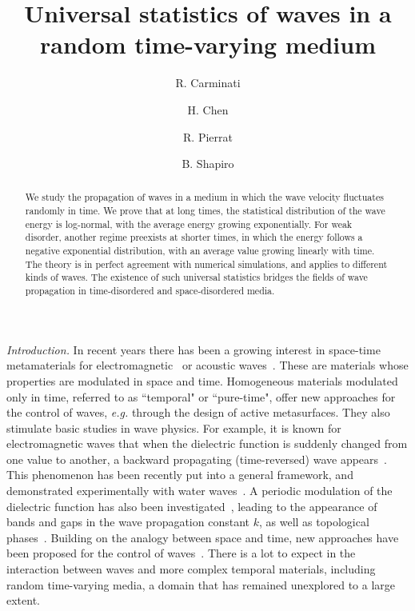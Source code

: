 \documentclass[ prl, twocolumn, superscriptaddress, amsfonts, amsmath,floatfix]{revtex4-1}
\begin{document}
\title{Universal statistics of waves in a random time-varying medium}

\author{R. Carminati} 
\author{H. Chen}
\author{R. Pierrat}
\author{B. Shapiro}

\begin{abstract}
We study the propagation of waves in a medium in which the wave velocity fluctuates randomly in time. We prove that at long times, the statistical distribution of the wave energy is log-normal, with the average energy growing exponentially. For weak disorder, another regime preexists at shorter times, in which the energy follows a negative exponential distribution, with an average value growing linearly with time. The theory is in perfect agreement with numerical simulations, and applies to different kinds of waves. The existence of such universal statistics bridges the fields of wave propagation in time-disordered and space-disordered media.
\end{abstract}

\maketitle

{\it Introduction.}
In recent years there has been a growing interest in space-time metamaterials for electromagnetic~\cite{Caloz2020} or acoustic waves~\cite{Fleury2019}. These are materials whose properties are modulated in space and time. Homogeneous materials modulated only in time, referred to as ``temporal" or ``pure-time", offer new approaches for the control of waves, {\it e.g.} through the design of active metasurfaces. They also stimulate basic studies in wave physics. For example, it is known for electromagnetic waves that when the dielectric function is suddenly changed from one value to another, a backward propagating (time-reversed) wave appears~\cite{Morgenthaler1958}. This phenomenon has been recently put into a general framework, and demonstrated experimentally with water waves~\cite{Bacot2016,Bacot2019}. A periodic modulation of the dielectric function has also been investigated~\cite{Holberg1966,Zurita2009}, leading to the appearance of bands and gaps in the wave propagation constant $k$, as well as topological phases~\cite{Lustig2018}. Building on the analogy between space and time, new approaches have been proposed for the control of waves~\cite{Caloz2018,Pacheco2020,Pacheco2020b}. There is a lot to expect in the interaction between waves and more complex temporal materials, including random time-varying media, a domain that has remained unexplored to a large extent.
\end{document}
